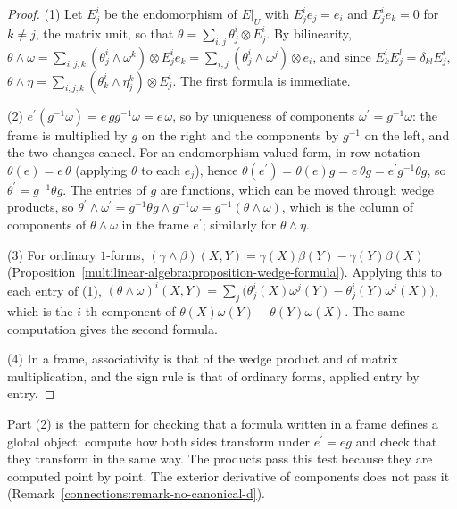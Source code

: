 \begin{proof}
(1) Let $E^i_j$ be the endomorphism of $E|_U$ with $E^i_je_j = e_i$ and $E^i_je_k = 0$ for $k \neq j$, the matrix unit, so that $\theta = \sum_{i,j}\theta^i_j \otimes E^i_j$. By bilinearity,
$\theta \wedge \omega = \sum_{i,j,k}(\theta^i_j \wedge \omega^k) \otimes E^i_je_k = \sum_{i,j}(\theta^i_j \wedge \omega^j) \otimes e_i$, and since $E^i_kE^l_j = \delta_{kl}E^i_j$,
$\theta \wedge \eta = \sum_{i,j,k}(\theta^i_k \wedge \eta^k_j) \otimes E^i_j$. The first formula is immediate.

(2) $e^{\prime}(g^{-1}\omega) = e\,gg^{-1}\omega = e\,\omega$, so by uniqueness of components $\omega^{\prime} = g^{-1}\omega$: the frame is multiplied by $g$ on the right and the components by $g^{-1}$ on the
left, and the two changes cancel. For an endomorphism-valued form, in row notation $\theta(e) = e\,\theta$ (applying $\theta$ to each $e_j$), hence
$\theta(e^{\prime}) = \theta(e)g = e\,\theta g = e^{\prime}g^{-1}\theta g$, so $\theta^{\prime} = g^{-1}\theta g$. The entries of $g$ are functions, which can be moved through wedge products, so
$\theta^{\prime} \wedge \omega^{\prime} = g^{-1}\theta g \wedge g^{-1}\omega = g^{-1}(\theta \wedge \omega)$, which is the column of components of $\theta \wedge \omega$ in the frame $e^{\prime}$; similarly for $\theta \wedge \eta$.

(3) For ordinary $1$-forms, $(\gamma \wedge \beta)(X, Y) = \gamma(X)\beta(Y) - \gamma(Y)\beta(X)$ (Proposition~\ref{multilinear-algebra:proposition-wedge-formula}). Applying this to each entry of (1),
$(\theta \wedge \omega)^i(X, Y) = \sum_j\bigl(\theta^i_j(X)\omega^j(Y) - \theta^i_j(Y)\omega^j(X)\bigr)$, which is the $i$-th component of $\theta(X)\omega(Y) - \theta(Y)\omega(X)$. The same computation gives the
second formula.

(4) In a frame, associativity is that of the wedge product and of matrix multiplication, and the sign rule is that of ordinary forms, applied entry by entry.
\end{proof}

Part (2) is the pattern for checking that a formula written in a frame defines a global object: compute how both sides transform under $e^{\prime} = eg$ and check that they transform in the same
way. The products pass this test because they are computed point by point. The exterior derivative of components does not pass it (Remark~\ref{connections:remark-no-canonical-d}).

